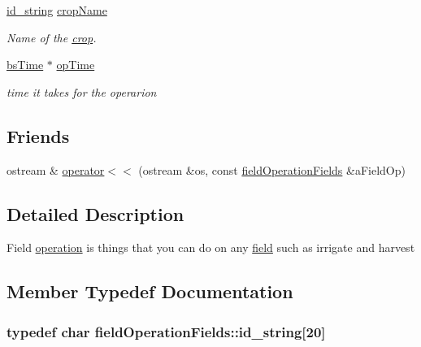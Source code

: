 \begin{DoxyCompactItemize}
\hyperlink{classfield_operation_fields_a65517d20c09329343461131d07d48ecb}{id\_\-string} \hyperlink{classfield_operation_fields_a2820c03f420902fdaeb3d8b5a798c444}{cropName}
\begin{DoxyCompactList}\small\item\em Name of the \hyperlink{classcrop}{crop}. \item\end{DoxyCompactList}\item 
\hyperlink{classbs_time}{bsTime} $\ast$ \hyperlink{classfield_operation_fields_a45add696631149bbc8f7f9ace6529ad3}{opTime}
\begin{DoxyCompactList}\small\item\em time it takes for the operarion \item\end{DoxyCompactList}\end{DoxyCompactItemize}
\subsection*{Friends}
\begin{DoxyCompactItemize}
\item 
ostream \& \hyperlink{classfield_operation_fields_a24dfd201a1faafc49dab9678977b12e3}{operator$<$$<$} (ostream \&os, const \hyperlink{classfield_operation_fields}{fieldOperationFields} \&aFieldOp)
\end{DoxyCompactItemize}


\subsection{Detailed Description}
Field \hyperlink{classoperation}{operation} is things that you can do on any \hyperlink{classfield}{field} such as irrigate and harvest 

\subsection{Member Typedef Documentation}
\hypertarget{classfield_operation_fields_a65517d20c09329343461131d07d48ecb}{
\subsubsection[{id\_\-string}]{\setlength{\rightskip}{0pt plus 5cm}typedef char {\bf fieldOperationFields::id\_\-string}\mbox{[}20\mbox{]}}}
\label{classfield_operation_fields_a65517d20c09329343461131d07d48ecb}


